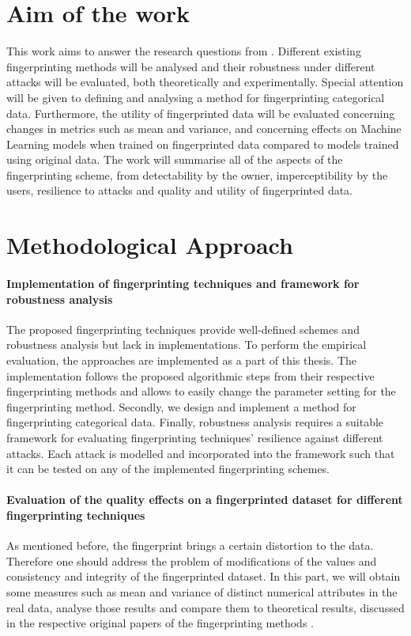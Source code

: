 \section{Aim of the work}
This work aims to answer the research questions from .
Different existing fingerprinting methods will be analysed and their robustness under different attacks will be evaluated, both theoretically and experimentally.
Special attention will be given to defining and analysing a method for fingerprinting categorical data. Furthermore, the utility of fingerprinted data will be evaluated concerning changes in metrics such as mean and variance, and concerning effects on Machine Learning models when trained on fingerprinted data compared to models trained using original data.
The work will summarise all of the aspects of the fingerprinting scheme, from detectability by the owner, imperceptibility by the users, resilience to attacks and quality and utility of fingerprinted data.

\section{Methodological Approach}

    \paragraph{Implementation of fingerprinting techniques and framework for robustness analysis} 
The proposed fingerprinting techniques \cite{li2005fingerprinting,liu2004block,guo2006fingerprinting} provide well-defined schemes and robustness analysis but lack in implementations. 
To perform the empirical evaluation, the approaches are implemented as a part of this thesis. 
The implementation follows the proposed algorithmic steps from their respective fingerprinting methods and allows to easily change the parameter setting for the fingerprinting method.
Secondly, we design and implement a method for fingerprinting categorical data.
Finally, robustness analysis requires a suitable framework for evaluating fingerprinting techniques' resilience against different attacks. 
Each attack is modelled and incorporated into the framework such that it can be tested on any of the implemented fingerprinting schemes.

\paragraph{Evaluation of the quality effects on a fingerprinted dataset for different fingerprinting techniques}
As mentioned before, the fingerprint brings a certain distortion to the data. 
Therefore one should address the problem of modifications of the values and consistency and integrity of the fingerprinted dataset.
In this part, we will obtain some measures such as mean and variance of distinct numerical attributes in the real data, analyse those results and compare them to theoretical results, discussed in the respective original papers of the fingerprinting methods \cite{li2005fingerprinting, liu2004block, constantin2005watermill}.

